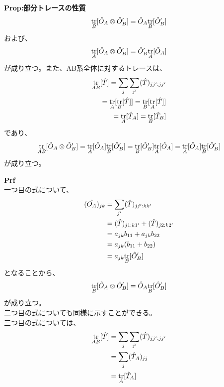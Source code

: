 \documentclass[a4paper,11pt]{jsarticle}
\begin{document}
\begin{itembox}[l]{\textbf{Prop:部分トレースの性質}}
    \begin{align}
        \underset{B}{\trace}[\hat{O}_A \otimes \hat{O}'_B] = \hat{O}_A\underset{B}{\trace}[ \hat{O}'_B]
    \end{align}
    および、
    \begin{align}
        \underset{A}{\trace}[\hat{O}_A \otimes \hat{O}'_B] = \hat{O}'_B\underset{A}{\trace}[ \hat{O}_A]
    \end{align}
    が成り立つ。また、AB系全体に対するトレースは、
    \begin{align}
        \underset{AB}{\trace}[\hat{T}] = \sum_j \sum_{j'} (\hat{T})_{jj':jj'} \\
        =\underset{A}{\trace}[\underset{B}{\trace}[\hat{T}]]=\underset{B}{\trace}[\underset{A}{\trace}[\hat{T}]]\\
        =\underset{A}{\trace}[\hat{T}_A]=\underset{B}{\trace}[\hat{T}_B]
    \end{align}
    であり、
    \begin{align}
        \underset{AB}{\trace}[\hat{O}_A \otimes \hat{O}'_B] = \underset{A}{\trace}[\hat{O}_A]\underset{B}{\trace}[\hat{O}'_B]=\underset{B}{\trace}[\hat{O}'_B]\underset{A}{\trace}[\hat{O}_A]=\underset{A}{\trace}[\hat{O}_A]\underset{B}{\trace}[\hat{O}'_B]
    \end{align}
    が成り立つ。
\end{itembox}
\textbf{Prf}\\
一つ目の式について、
\begin{align}
   ( \hat{O_A})_{jk} &=\sum_{j'}(\hat{T})_{jj':kk'}\\
    &=(\hat{T})_{j1:k1'}+(\hat{T})_{j2:k2'}\\
    &=a_{jk}b_{11}+a_{jk}b_{22}\\
    &=a_{jk}(b_{11}+b_{22})\\
    &=a_{jk}\underset{B}{\trace}[\hat{O}'_B]
\end{align}
となることから、
\begin{align}
    \underset{B}{\trace}[\hat{O}_A \otimes \hat{O}'_B] = \hat{O}_A\underset{B}{\trace}[ \hat{O}'_B]
\end{align}
が成り立つ。\\
二つ目の式についても同様に示すことができる。\\
三つ目の式については、
\begin{align}
    \underset{AB}{\trace}[\hat{T}] &= \sum_j \sum_{j'} (\hat{T})_{jj':jj'} \\
    &=\sum_j (\hat{T}_A)_{jj} \\
    &=\underset{A}{\trace}[\hat{T}_A]
\end{align}
\end{document}

